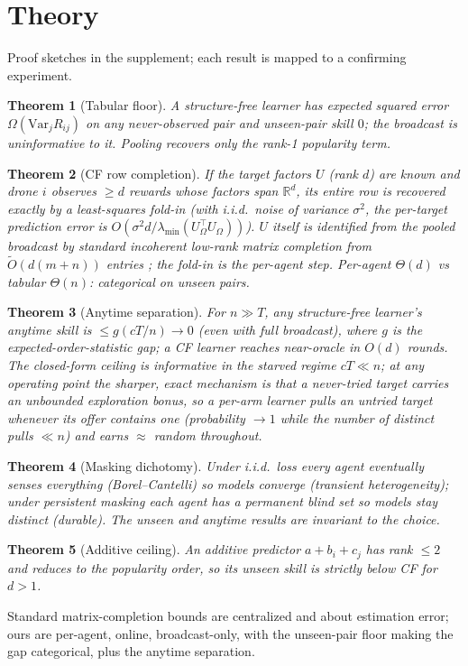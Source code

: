 \documentclass[11pt]{article}
\theoremstyle{plain}
\newtheorem{theorem}{Theorem}
\begin{document}
\section{Theory}
Proof sketches in the supplement; each result is mapped to a confirming experiment.
\begin{theorem}[Tabular floor]\label{t1}
A structure-free learner has expected squared error $\Omega(\mathrm{Var}_j R_{ij})$
on any never-observed pair and unseen-pair skill $0$; the broadcast is uninformative
to it. Pooling recovers only the rank-1 popularity term.
\end{theorem}
\begin{theorem}[CF row completion]\label{t2}
If the target factors $U$ (rank $d$) are known and drone $i$ observes $\ge d$ rewards
whose factors span $\mathbb{R}^d$, its entire row is recovered exactly by a least-squares
fold-in (with i.i.d.\ noise of variance $\sigma^2$, the per-target prediction error is
$O(\sigma^2 d / \lambda_{\min}(U_\Omega^\top U_\Omega))$). $U$ itself is identified from
the pooled broadcast by standard \emph{incoherent} low-rank matrix completion from
$\tilde O(d(m+n))$ entries \cite{candes2009exact,keshavan2010matrix,recht2011simpler};
the fold-in is the per-agent step. Per-agent $\Theta(d)$ vs tabular $\Theta(n)$:
categorical on unseen pairs.
\end{theorem}
\begin{theorem}[Anytime separation]\label{t3}
For $n\gg T$, any structure-free learner's anytime skill is $\le g(cT/n)\to 0$ (even
with full broadcast), where $g$ is the expected-order-statistic gap; a CF learner
reaches near-oracle in $O(d)$ rounds. The closed-form ceiling is informative in the
\emph{starved} regime $cT \ll n$; at any operating point the sharper, exact mechanism
is that a never-tried target carries an unbounded exploration bonus, so a per-arm
learner pulls an untried target whenever its offer contains one (probability $\to 1$
while the number of distinct pulls $\ll n$) and earns $\approx$ random throughout.
\end{theorem}
\begin{theorem}[Masking dichotomy]\label{t4}
Under i.i.d.\ loss every agent eventually senses everything (Borel--Cantelli) so
models converge (transient heterogeneity); under persistent masking each agent has a
permanent blind set so models stay distinct (durable). The unseen and anytime
results are invariant to the choice.
\end{theorem}
\begin{theorem}[Additive ceiling]\label{t5}
An additive predictor $a+b_i+c_j$ has rank $\le 2$ and reduces to the popularity
order, so its unseen skill is strictly below CF for $d>1$.
\end{theorem}
Standard matrix-completion bounds \cite{candes2009exact,keshavan2010matrix,recht2011simpler}
are centralized and about estimation error; ours are per-agent, online, broadcast-only,
with the unseen-pair floor making the gap categorical, plus the anytime separation.
\end{document}
